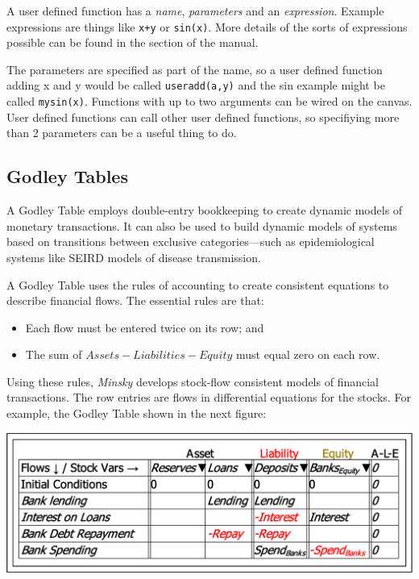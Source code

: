 A user defined function has a {\em name}, {\em parameters} and
an {\em expression}. Example expressions are things like \verb'x+y'
or \verb'sin(x)'. More details of the sorts of expressions possible
can be found in the 
section of the manual.

The parameters are specified as part of the name, so a user defined
function adding x and y would be called \verb'useradd(a,y)' and the
sin example might be called \verb'mysin(x)'. Functions with up to
two arguments can be wired on the canvas. User defined functions can
call other user defined functions, so specifiying more than 2 parameters
can be a useful thing to do.

\subsection{Godley Tables}

\label{godley}\label{GodleyIcon}

A Godley Table employs double-entry bookkeeping to create dynamic
models of monetary transactions. It can also be used to build dynamic
models of systems based on transitions between exclusive categories---such
as epidemiological systems like SEIRD models of disease transmission.

A Godley Table uses the rules of accounting to create consistent equations
to describe financial flows. The essential rules are that:
\begin{itemize}
\item Each flow must be entered twice on its row; and
\item The sum of $Assets-Liabilities-Equity$ must equal zero on each row.
\end{itemize}
Using these rules, \emph{Minsky} develops stock-flow consistent models
of financial transactions. The row entries are flows in differential
equations for the stocks. For example, the Godley Table shown in the
next figure:

\includegraphics{images/GodleyTableImages}

